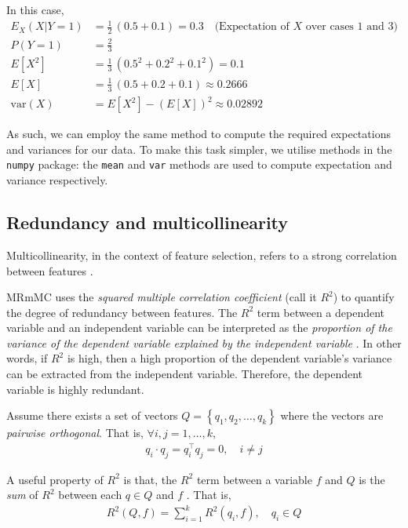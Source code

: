 \documentclass[12pt, twoside, a4paper]{report}
\def\var{\text{var}}
\begin{document}
In this case,
\begin{align*}
E_X(X|Y=1) &= \frac{1}{2} \,  (0.5+0.1) = 0.3 \quad \text{(Expectation of $X$ over cases 1 and 3)} \\
P(Y=1) &= \frac{2}{3} \\
E[X^2] &= \frac{1}{3} \, (0.5^2+0.2^2+0.1^2) = 0.1 \\
E[X] &= \frac{1}{3} \, (0.5+0.2+0.1) \approx 0.2666 \\
\var(X) &= E[X^2] - (E[X])^2 \approx 0.02892
\end{align*}

As such, we can employ the same method to compute the required expectations and variances for our data. To make this task simpler, we utilise methods in the \texttt{numpy} \cite{RefWorks:214} package: the \texttt{mean} and \texttt{var} methods are used to compute expectation and variance respectively.

\subsection{Redundancy and multicollinearity}

Multicollinearity, in the context of feature selection, refers to a strong correlation between features \cite{RefWorks:234}.

MRmMC uses the \textit{squared multiple correlation coefficient} (call it $R^2$) to quantify the degree of redundancy between features. The $R^2$ term between a dependent variable and an independent variable can be interpreted as the \textit{proportion of the variance of the dependent variable explained by the independent variable} \cite{RefWorks:193}. In other words, if $R^2$ is high, then a high proportion of the dependent variable's variance can be extracted from the independent variable. Therefore, the dependent variable is highly redundant.

Assume there exists a set of vectors $Q=\left\lbrace q_1, q_2, \dots, q_k \right\rbrace$ where the vectors are \textit{pairwise orthogonal}. That is, $\forall i,j = 1, \dots, k$,
\begin{align*}
q_i \cdot q_j = q_i^\top q_j = 0, \quad i \neq j 
\end{align*}

A useful property of $R^2$ is that, the $R^2$ term between a variable $f$ and $Q$ is the \textit{sum} of $R^2$ between each $q \in Q$ and $f$ \cite{RefWorks:193}. That is,
\begin{align*}
R^2(Q, f) = \sum_{i=1}^k R^2(q_i, f), \quad q_i \in Q
\end{align*}
\end{document}
